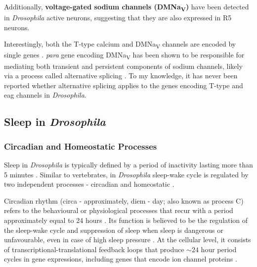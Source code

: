 \documentclass[../main.tex]{subfiles}
\begin{document}
Additionally, \textbf{voltage-gated sodium channels (DMNa\textsubscript{V})} have been detected in \textit{Drosophila} active neurons, suggesting that they are also expressed in R5 neurons.

Interestingly, both the T-type calcium and DMNa\textsubscript{V} channels are encoded by single genes \cite{jeongCaa1TFlyTtype2015,ravenscroftDrosophilaVoltageGatedSodium2020}. \textit{para} gene encoding DMNa\textsubscript{V} has been shown to be responsible for mediating both transient and persistent components of sodium channels, likely via a process called alternative splicing \cite{linAlternativeSplicingVoltageGated2009}. To my knowledge, it has never been reported whether alternative splicing applies to the genes encoding T-type and \gls{eag} channels in \textit{Drosophila}.



\subsection{Sleep in \textit{Drosophila}}

\subsubsection{Circadian and Homeostatic Processes}

Sleep in \textit{Drosophila} is typically defined by a period of inactivity lasting more than 5 minutes \cite{dubowyCircadianRhythmsSleep2017,shaferRegulationDrosophilaSleep2021}. Similar to vertebrates, in \textit{Drosophila} sleep-wake cycle is regulated by two independent processes - circadian and homeostatic \cite{doppSinglecellTranscriptomicsReveals2024,liuSleepDriveEncoded2016}.

Circadian rhythm (circa - approximately, diem - day; also known as process C) refers to the behavioural or physiological processes that recur with a period approximately equal to 24 hours \cite{fernandez-chiappeHighFrequencyNeuronalBursting2021,dubowyCircadianRhythmsSleep2017}. Its function is believed to be the regulation of the sleep-wake cycle and suppression of sleep when sleep is dangerous or unfavourable, even in case of high sleep pressure \cite{shaferRegulationDrosophilaSleep2021,andreaniCircadianProgrammingEllipsoid2022}.
At the cellular level, it consists of transcriptional-translational feedback loops that produce $\sim 24$ hour period cycles in gene expressions, including genes that encode ion channel proteins
\cite{doppSinglecellTranscriptomicsReveals2024,dubowyCircadianRhythmsSleep2017,andreaniCircadianProgrammingEllipsoid2022}.
\end{document}
